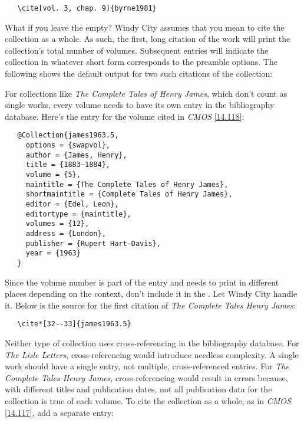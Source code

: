 \documentclass[11pt,letterpaper,oneside]{article}
\begin{document}
\begin{verbatim}
   \cite[vol. 3, chap. 9]{byrne1981}
\end{verbatim}

What if you leave the  empty? Windy City assumes
that you mean to cite the collection as a whole. As such, the first,
long citation of the work will print the collection's total number of
volumes. Subsequent entries will indicate the collection in whatever
short form corresponds to the preamble options. The following shows
the default output for two such citations of the collection:

\begin{citeonly}
\item \cite{byrne1981}
\item \cite{byrne1981}
\end{citeonly}

For collections like \textit{The Complete Tales of Henry James}, which
don't count as single works, every volume needs to have its own entry
in the bibliography database. Here's the entry for the volume cited in
\textit{CMOS} \ref{14.118}:

\begin{verbatim}
   @Collection{james1963.5,
     options = {swapvol},
     author = {James, Henry},
     title = {1883–1884},
     volume = {5},
     maintitle = {The Complete Tales of Henry James},
     shortmaintitle = {Complete Tales of Henry James},
     editor = {Edel, Leon},
     editortype = {maintitle},
     volumes = {12},
     address = {London},
     publisher = {Rupert Hart-Davis},
     year = {1963}
   }
\end{verbatim}

Since the volume number is part of the entry and needs to print in
different places depending on the context, don't include it in the
. Let Windy City handle it. Below is the source for
the first citation of \textit{The Complete Tales Henry James}:

\begin{verbatim}
   \cite*[32--33]{james1963.5}
\end{verbatim}

Neither type of collection uses cross-referencing in the bibliography
database. For \textit{The Lisle Letters}, cross-referencing would
introduce needless complexity. A single work should have a single
entry, not multiple, cross-referenced entries. For \textit{The
Complete Tales Henry James}, cross-referencing would result in errors
because, with different titles and publication dates, not all
publication data for the collection is true of each volume. To cite
the collection as a whole, as in \textit{CMOS} \ref{14.117}, add a
separate entry:
\end{document}
